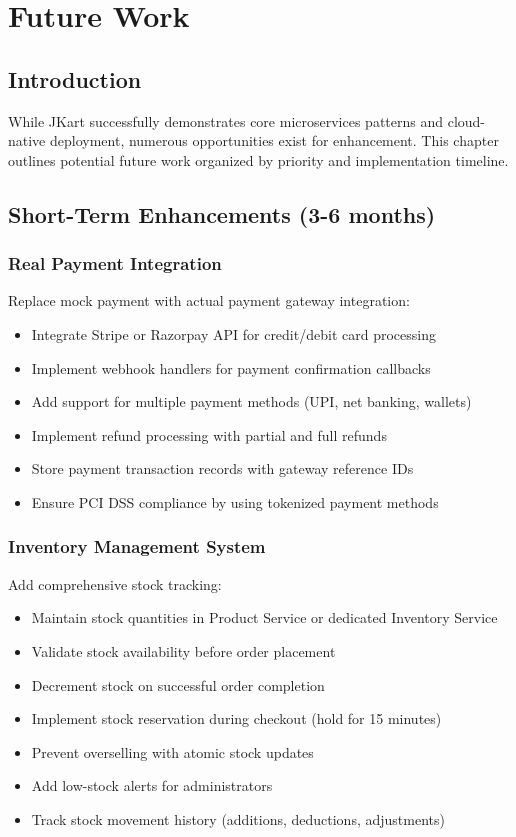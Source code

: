 \chapter{Future Work}

\section{Introduction}

While JKart successfully demonstrates core microservices patterns and cloud-native deployment, numerous opportunities exist for enhancement. This chapter outlines potential future work organized by priority and implementation timeline.

\section{Short-Term Enhancements (3-6 months)}

\subsection{Real Payment Integration}

Replace mock payment with actual payment gateway integration:
\begin{itemize}
    \item Integrate Stripe or Razorpay API for credit/debit card processing
    \item Implement webhook handlers for payment confirmation callbacks
    \item Add support for multiple payment methods (UPI, net banking, wallets)
    \item Implement refund processing with partial and full refunds
    \item Store payment transaction records with gateway reference IDs
    \item Ensure PCI DSS compliance by using tokenized payment methods
\end{itemize}

\subsection{Inventory Management System}

Add comprehensive stock tracking:
\begin{itemize}
    \item Maintain stock quantities in Product Service or dedicated Inventory Service
    \item Validate stock availability before order placement
    \item Decrement stock on successful order completion
    \item Implement stock reservation during checkout (hold for 15 minutes)
    \item Prevent overselling with atomic stock updates
    \item Add low-stock alerts for administrators
    \item Track stock movement history (additions, deductions, adjustments)
\end{itemize}

